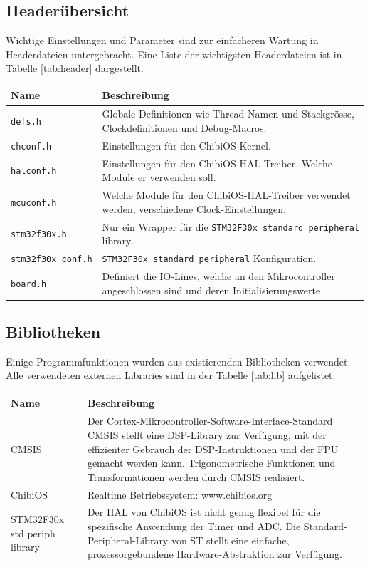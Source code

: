 \subsection*{Headerübersicht}
Wichtige Einstellungen und Parameter sind zur einfacheren Wartung in Headerdateien untergebracht. Eine Liste der wichtigsten Headerdateien ist in Tabelle \ref{tab:header} dargestellt.\\
\begin{tabularx}{\textwidth}{l|X}
	Name & Beschreibung \\ \hline
	\texttt{defs.h} & Globale Definitionen wie Thread-Namen und Stackgrösse, Clockdefinitionen und Debug-Macros. \\ \hline
	\texttt{chconf.h} & Einstellungen für den ChibiOS-Kernel. \\ \hline
	\texttt{halconf.h} & Einstellungen für den ChibiOS-HAL-Treiber. Welche Module er verwenden soll. \\ \hline
	\texttt{mcuconf.h} & Welche Module für den ChibiOS-HAL-Treiber verwendet werden, verschiedene Clock-Einstellungen. \\ \hline
	\texttt{stm32f30x.h} & Nur ein Wrapper für die \texttt{STM32F30x standard peripheral} library. \\ \hline
	\texttt{stm32f30x\_conf.h} & \texttt{STM32F30x standard peripheral} Konfiguration. \\ \hline
	\texttt{board.h} & Definiert die IO-Lines, welche an den Mikrocontroller angeschlossen sind und deren Initialisierungswerte. \\ \hline
\end{tabularx}
\label{tab:header}

\subsection*{Bibliotheken}
Einige Programmfunktionen wurden aus existierenden Bibliotheken verwendet. Alle verwendeten externen Libraries sind in der Tabelle \ref{tab:lib} aufgelistet.\\
\begin{tabularx}{\textwidth}{l|X}
	Name & Beschreibung \\ \hline
	CMSIS &  Der Cortex-Mikrocontroller-Software-Interface-Standard CMSIS stellt eine DSP-Library zur Verfügung, mit der effizienter Gebrauch der DSP-Instruktionen und der FPU gemacht werden kann. Trigonometrische Funktionen und Transformationen werden durch CMSIS realisiert. \\ \hline
	ChibiOS & Realtime Betriebssystem: www.chibios.org \\ \hline
	STM32F30x std periph library & Der HAL von ChibiOS ist nicht genug flexibel für die spezifische Anwendung der Timer und ADC. Die Standard-Peripheral-Library von ST stellt eine einfache, prozessorgebundene Hardware-Abstraktion zur Verfügung.  \\ \hline
\end{tabularx}
\label{tab:lib}


